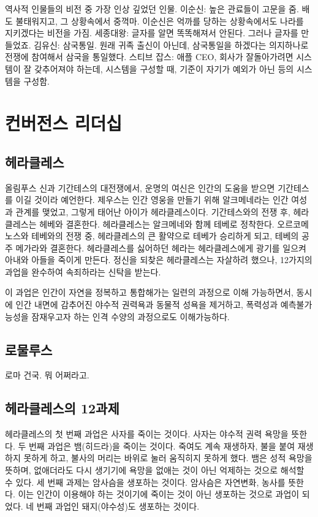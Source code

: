 역사적 인물들의 비전 중 가장 인상 깊었던 인물.
이순신: 높은 관료들이 고문을 줌. 배도 불태워지고, 그 상황속에서 중꺽마. 
이순신은 억까를 당하는 상황속에서도 나라를 지키겠다는 비전을 가짐.
세종대왕: 글자를 알면 똑똑해져서 안된다. 그러나 글자를 만들었죠.
김유신: 삼국통일. 원래 귀족 출신이 아닌데, 삼국통일을 하겠다는 의지하나로 전쟁에 참여해서 삼국을 통일했다.
스티브 잡스: 애플 CEO, 회사가 잘돌아가려면 시스템이 잘 갖추어져야 하는데, 시스템을 구성할 때, 기준이
자기가 예외가 아닌 등의 시스템을 구성함.

\section{컨버전스 리더십}

\subsection{헤라클레스}

올림푸스 신과 기간테스의 대전쟁에서, 운명의 여신은 인간의 도움을 받으면
기간테스를 이길 것이라 예언한다. 제우스는 인간 영웅을 만들기 위해 알크메네라는
인간 여성과 관계를 맺었고, 그렇게 태어난 아이가 헤라클레스이다. 기간테스와의
전쟁 후, 헤라클레스는 헤베와 결혼한다. 헤라클레스는 알크메네와 함께 테베로
정착한다. 오르코메노스와 테베와의 전쟁 중, 헤라클레스의 큰 활약으로 테베가
승리하게 되고, 테베의 공주 메가라와 결혼한다. 헤라클레스를 싫어하던 헤라는
헤라클레스에게 광기를 일으켜 아내와 아들을 죽이게 만든다. 정신을 되찾은
헤라클레스는 자살하려 했으나, 12가지의 과업을 완수하여 속죄하라는 신탁을 받는다.

이 과업은 인간이 자연을 정복하고 통합해가는 일련의 과정으로 이해 가능하면서,
동시에 인간 내면에 감추어진 야수적 권력욕과 동물적 성욕을 제거하고, 폭력성과
예측불가능성을 잠재우고자 하는 인격 수양의 과정으로도 이해가능하다.

\subsection{로물루스}

로마 건국. 뭐 어쩌라고.

\subsection{헤라클레스의 12과제}

헤라클레스의 첫 번째 과업은 사자를 죽이는 것이다. 사자는 야수적 권력 욕망을
뜻한다. 두 번째 과업은 뱀(히드라)을 죽이는 것이다. 죽여도 계속 재생하자, 불을
붙여 재생하지 못하게 하고, 불사의 머리는 바위로 눌러 움직히지 못하게 했다. 뱀은
성적 욕망을 뜻하며, 없애더라도 다시 생기기에 욕망을 없애는 것이 아닌 억제하는
것으로 해석할 수 있다. 세 번째 과제는 암사슴을 생포하는 것이다. 암사슴은
자연변화, 농사를 뜻한다. 이는 인간이 이용해야 하는 것이기에 죽이는 것이 아닌
생포하는 것으로 과업이 되었다. 네 번째 과업인 돼지(야수성)도 생포하는 것이다.

